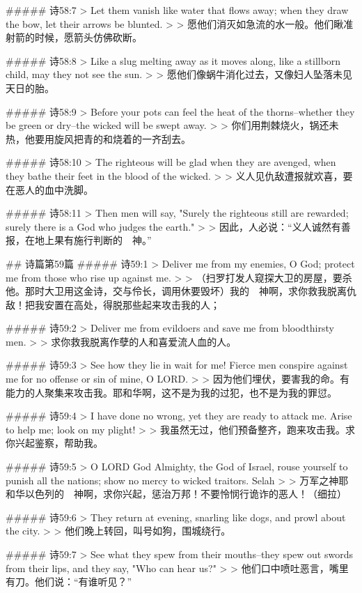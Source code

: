 ##### 诗58:7
> Let them vanish like water that flows away; when they draw the bow, let their arrows be blunted.
>
> 愿他们消灭如急流的水一般。他们瞅准射箭的时候，愿箭头仿佛砍断。


##### 诗58:8
> Like a slug melting away as it moves along, like a stillborn child, may they not see the sun.
>
> 愿他们像蜗牛消化过去，又像妇人坠落未见天日的胎。


##### 诗58:9
> Before your pots can feel the heat of the thorns--whether they be green or dry--the wicked will be swept away.
>
> 你们用荆棘烧火，锅还未热，他要用旋风把青的和烧着的一齐刮去。


##### 诗58:10
> The righteous will be glad when they are avenged, when they bathe their feet in the blood of the wicked.
>
> 义人见仇敌遭报就欢喜，要在恶人的血中洗脚。


##### 诗58:11
> Then men will say, "Surely the righteous still are rewarded; surely there is a God who judges the earth."
>
> 因此，人必说：“义人诚然有善报，在地上果有施行判断的　神。”


## 诗篇第59篇
##### 诗59:1
> Deliver me from my enemies, O God; protect me from those who rise up against me.
>
> （扫罗打发人窥探大卫的房屋，要杀他。那时大卫用这金诗，交与伶长，调用休要毁坏）我的　神啊，求你救我脱离仇敌！把我安置在高处，得脱那些起来攻击我的人；


##### 诗59:2
> Deliver me from evildoers and save me from bloodthirsty men.
>
> 求你救我脱离作孽的人和喜爱流人血的人。


##### 诗59:3
> See how they lie in wait for me! Fierce men conspire against me for no offense or sin of mine, O LORD.
>
> 因为他们埋伏，要害我的命。有能力的人聚集来攻击我。耶和华啊，这不是为我的过犯，也不是为我的罪愆。


##### 诗59:4
> I have done no wrong, yet they are ready to attack me. Arise to help me; look on my plight!
>
> 我虽然无过，他们预备整齐，跑来攻击我。求你兴起鉴察，帮助我。


##### 诗59:5
> O LORD God Almighty, the God of Israel, rouse yourself to punish all the nations; show no mercy to wicked traitors. Selah
>
> 万军之神耶和华以色列的　神啊，求你兴起，惩治万邦！不要怜悯行诡诈的恶人！（细拉）


##### 诗59:6
> They return at evening, snarling like dogs, and prowl about the city.
>
> 他们晚上转回，叫号如狗，围城绕行。


##### 诗59:7
> See what they spew from their mouths--they spew out swords from their lips, and they say, "Who can hear us?"
>
> 他们口中喷吐恶言，嘴里有刀。他们说：“有谁听见？”


